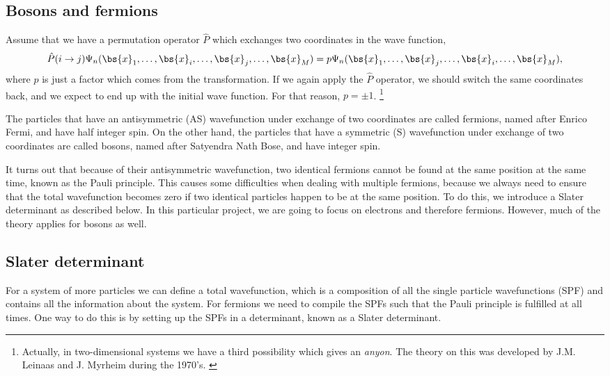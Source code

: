 \subsection{Bosons and fermions} \label{subsubsec:symmetry}
Assume that we have a permutation operator $\hat{P}$ which exchanges two coordinates in the wave function,
\begin{equation}
\hat{P}(i\rightarrow j)\Psi_n(\bs{x}_1,\hdots,\bs{x}_i,\hdots,\bs{x}_j,\hdots,\bs{x}_M)=p\Psi_n(\bs{x}_1,\hdots,\bs{x}_j,\hdots,\bs{x}_i,\hdots,\bs{x}_M),
\end{equation}
where $p$ is just a factor which comes from the transformation. If we again apply the $\hat{P}$ operator, we should switch the same coordinates back, and we expect to end up with the initial wave function. For that reason, $p=\pm1$. \footnote{Actually, in two-dimensional systems we have a third possibility which gives an \textit{anyon}. The theory on this was developed by J.M. Leinaas and J. Myrheim during the 1970's. \cite{leinaas_one_1977}}

The particles that have an antisymmetric (AS) wavefunction under exchange of two coordinates are called fermions, named after Enrico Fermi, and have half integer spin. On the other hand, the particles that have a symmetric (S) wavefunction under exchange of two coordinates are called bosons, named after Satyendra Nath Bose, and have integer spin. 

It turns out that because of their antisymmetric wavefunction, two identical fermions cannot be found at the same position at the same time, known as the Pauli principle. This causes some difficulties when dealing with multiple fermions, because we always need to ensure that the total wavefunction becomes zero if two identical particles happen to be at the same position. To do this, we introduce a Slater determinant as described below. In this particular project, we are going to focus on electrons and therefore fermions. However, much of the theory applies for bosons as well.

\subsection{Slater determinant} \label{subsec:slater}
For a system of more particles we can define a total wavefunction, which is a composition of all the single particle wavefunctions (SPF) and contains all the information about the system. For fermions we need to compile the SPFs such that the Pauli principle is fulfilled at all times. One way to do this is by setting up the SPFs in a determinant, known as a Slater determinant.

